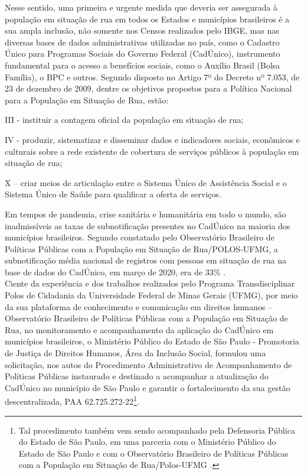 \documentclass[14pt]{extarticle}
\begin{document}
Nesse sentido, uma primeira e urgente medida que deveria ser assegurada à população em situação de rua em todos os Estados e municípios brasileiros é a sua ampla inclusão, não somente nos Censos realizados pelo IBGE, mas nas diversas bases de dados administrativas utilizadas no país, como o Cadastro Único para Programas Sociais do Governo Federal (CadÚnico), instrumento fundamental para o acesso a benefícios sociais, como o Auxílio Brasil (Bolsa Família), o BPC e outros. Segundo disposto no Artigo 7º do Decreto nº 7.053, de 23 de dezembro de 2009, dentre os objetivos propostos para a Política Nacional para a População em Situação de Rua, estão:

\vspace{-0.5cm}
\begin{trivlist}\leftskip=4cm
\begin{singlespace}
\item\small III - instituir a contagem oficial da população em situação de rua;
\item\small IV - produzir, sistematizar e disseminar dados e indicadores sociais, econômicos e culturais sobre a rede existente de cobertura de serviços públicos à população em situação de rua;
\item\small X – criar meios de articulação entre o Sistema Único de Assistência Social e o Sistema Único de Saúde para qualificar a oferta de serviços.
\end{singlespace}
\end{trivlist}


Em tempos de pandemia, crise sanitária e humanitária em todo o mundo, são inadmissíveis as taxas de subnotificação presentes no CadÚnico na maioria dos municípios brasileiros. Segundo constatado pelo Observatório Brasileiro de Políticas Públicas com a População em Situação de Rua/POLOS-UFMG, a subnotificação média nacional de registros com pessoas em situação de rua na base de dados do CadÚnico, em março de 2020, era de 33\% \citep{dias}.\\
 
Ciente da experiência e dos trabalhos realizados pelo Programa Transdisciplinar Polos de Cidadania da Universidade Federal de Minas Gerais (UFMG), por meio da sua plataforma de conhecimento e comunicação em direitos humanos –  Observatório Brasileiro de Políticas Públicas com a População em Situação de Rua, no monitoramento e acompanhamento da aplicação do CadÚnico em municípios brasileiros, o  Ministério Público do Estado de São Paulo - Promotoria de Justiça de Direitos Humanos, Área da Inclusão Social, formulou uma solicitação, nos autos do Procedimento Administrativo de Acompanhamento de Políticas Públicas instaurado e destinado a acompanhar a atualização do CadÚnico no município de São Paulo e garantir o fortalecimento da sua gestão descentralizada, PAA 62.725.272-22\footnote{Tal procedimento também vem sendo acompanhado pela Defensoria Pública do Estado de São Paulo, em uma parceria com o Ministério Público do Estado de São Paulo e com o Observatório Brasileiro de Políticas Públicas com a População em Situação de Rua/Polos-UFMG \citep{defensoria}.}.\\
\end{document}

